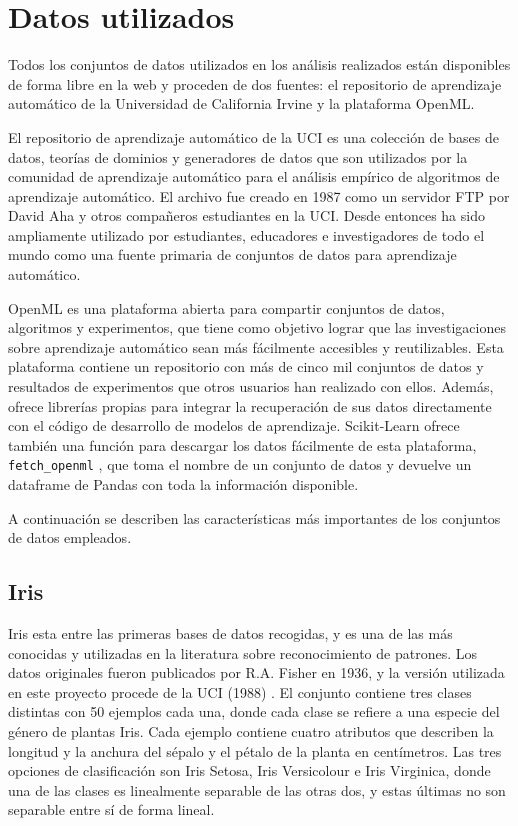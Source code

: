 \section{Datos utilizados}
\label{sec:datasets}

Todos los conjuntos de datos utilizados en los análisis realizados están disponibles de forma libre en la web y proceden de dos fuentes: el repositorio de aprendizaje automático de la Universidad de California Irvine y la plataforma OpenML.

El repositorio de aprendizaje automático de la UCI \cite{ml-uci} es una colección de bases de datos, teorías de dominios y generadores de datos que son utilizados por la comunidad de aprendizaje automático para el análisis empírico de algoritmos de aprendizaje automático. El archivo fue creado en 1987 como un servidor FTP por David Aha y otros compañeros estudiantes en la UCI. Desde entonces ha sido ampliamente utilizado por estudiantes, educadores e investigadores de todo el mundo como una fuente primaria de conjuntos de datos para aprendizaje automático.

OpenML \cite{openml} es una plataforma abierta para compartir conjuntos de datos, algoritmos y experimentos, que tiene como objetivo lograr que las investigaciones sobre aprendizaje automático sean más fácilmente accesibles y reutilizables. Esta plataforma contiene un repositorio con más de cinco mil conjuntos de datos y resultados de experimentos que otros usuarios han realizado con ellos. Además, ofrece librerías propias para integrar la recuperación de sus datos directamente con el código de desarrollo de modelos de aprendizaje. Scikit-Learn ofrece también una función para descargar los datos fácilmente de esta plataforma, \texttt{fetch\_openml} \cite{sk-fetch-openml}, que toma el nombre de un conjunto de datos y devuelve un dataframe de Pandas con toda la información disponible.

A continuación se describen las características más importantes de los conjuntos de datos empleados.

\subsection{Iris}

Iris esta entre las primeras bases de datos recogidas, y es una de las más conocidas y utilizadas en la literatura sobre reconocimiento de patrones. Los datos originales fueron publicados por R.A. Fisher en 1936, y la versión utilizada en este proyecto procede de la UCI (1988) \cite{iris-dataset}.
El conjunto contiene tres clases distintas con 50 ejemplos cada una, donde cada clase se refiere a una especie del género de plantas Iris. Cada ejemplo contiene cuatro atributos que describen la longitud y la anchura del sépalo y el pétalo de la planta en centímetros. Las tres opciones de clasificación son Iris Setosa, Iris Versicolour e Iris Virginica, donde una de las clases es linealmente separable de las otras dos, y estas últimas no son separable entre sí de forma lineal.

